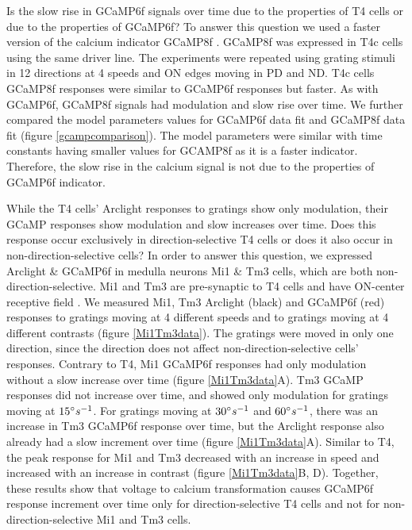 \documentclass[9pt,lineno]{elife}
\begin{document}
Is the slow rise in GCaMP6f signals over time due to the properties of T4 cells or due to the properties of GCaMP6f? To answer this question we used a faster version of the calcium indicator GCaMP8f \parencite{Zhang2020}. GCaMP8f was expressed in T4c cells using the same driver line. The experiments were repeated using grating stimuli in 12 directions at 4 speeds and ON edges moving in PD and ND. T4c cells GCaMP8f responses were similar to GCaMP6f responses but faster. As with GCaMP6f, GCaMP8f signals had modulation and slow rise over time. We further compared the model parameters values for GCaMP6f data fit and GCaMP8f data fit (figure \ref{gcampcomparison}). The model parameters were similar with time constants having smaller values for GCAMP8f as it is a faster indicator. Therefore, the slow rise in the calcium signal is not due to the properties of GCaMP6f indicator. 

While the T4 cells' Arclight responses to gratings show only modulation, their GCaMP responses show modulation and slow increases over time. Does this response occur exclusively in direction-selective T4 cells or does it also occur in non-direction-selective cells? In order to answer this question, we expressed Arclight \& GCaMP6f in medulla neurons Mi1 \& Tm3 cells, which are both non-direction-selective. Mi1 and Tm3 are pre-synaptic to T4 cells and have ON-center receptive field \parencite{Behnia2014, Arenz2017}. We measured Mi1, Tm3 Arclight (black) and GCaMP6f (red) responses to gratings moving at 4 different speeds and to gratings moving at 4 different contrasts (figure \ref{Mi1Tm3data}). The gratings were moved in only one direction, since the direction does not affect non-direction-selective cells' responses. Contrary to T4, Mi1 GCaMP6f responses had only modulation without a slow increase over time (figure \ref{Mi1Tm3data}A). Tm3 GCaMP responses did not increase over time, and showed only modulation for gratings moving at $15\degree s^{-1}$. For gratings moving at $30\degree s^{-1}$ and $60\degree s^{-1}$, there was an increase in Tm3 GCaMP6f response over time, but the Arclight response also already had a slow increment over time (figure \ref{Mi1Tm3data}A). Similar to T4, the peak response for Mi1 and Tm3 decreased with an increase in speed and increased with an increase in contrast (figure \ref{Mi1Tm3data}B, D). Together, these results show that voltage to calcium transformation causes GCaMP6f response increment over time only for direction-selective T4 cells and not for non-direction-selective Mi1 and Tm3 cells.
\end{document}
